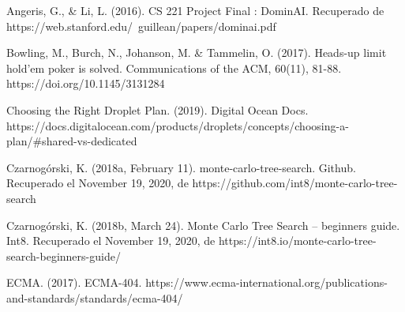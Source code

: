 \documentclass[11pt, oneside]{book}
\begin{document}
\begin{thebibliography}{111}






       Angeris, G., \& Li, L. (2016). CS 221 Project Final :
      DominAI. Recuperado de
      https://web.stanford.edu/~guillean/papers/dominai.pdf

      Bowling, M., Burch, N., Johanson, M. \& Tammelin, O.
      (2017). Heads-up limit hold’em poker is solved. Communications of the ACM,
      60(11), 81-88. https://doi.org/10.1145/3131284

      Choosing the Right Droplet Plan. (2019). Digital Ocean
      Docs.
      https://docs.digitalocean.com/products/droplets/concepts/choosing-a-plan/\#shared-vs-dedicated

      Czarnogórski, K. (2018a, February 11).
      monte-carlo-tree-search. Github. Recuperado el November 19, 2020, de
      https://github.com/int8/monte-carlo-tree-search
      
      Czarnogórski, K. (2018b, March 24). Monte Carlo Tree
      Search – beginners guide. Int8. Recuperado el November 19, 2020, de
      https://int8.io/monte-carlo-tree-search-beginners-guide/

      ECMA. (2017). ECMA-404.
      https://www.ecma-international.org/publications-and-standards/standards/ecma-404/


\end{thebibliography}
\end{document}
